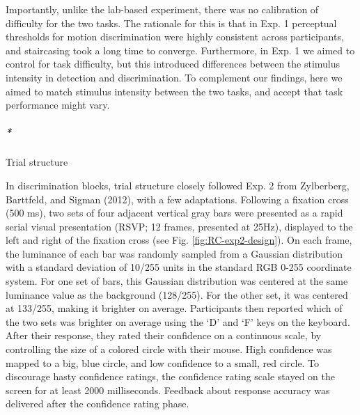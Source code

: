 \documentclass[
  english,
  man]{apa6}
\let\oldsubparagraph\subparagraph
\renewcommand{\subparagraph}[1]{\oldsubparagraph{#1}\mbox{}}
\begin{document}
Importantly, unlike the lab-based experiment, there was no calibration of difficulty for the two tasks. The rationale for this is that in Exp. 1 perceptual thresholds for motion discrimination were highly consistent across participants, and staircasing took a long time to converge. Furthermore, in Exp. 1 we aimed to control for task difficulty, but this introduced differences between the stimulus intensity in detection and discrimination. To complement our findings, here we aimed to match stimulus intensity between the two tasks, and accept that task performance might vary.

\hypertarget{trial-structure}{%
\subparagraph*{Trial structure}\label{trial-structure}}

In discrimination blocks, trial structure closely followed Exp. 2 from Zylberberg, Barttfeld, and Sigman (2012), with a few adaptations. Following a fixation cross (500 ms), two sets of four adjacent vertical gray bars were presented as a rapid serial visual presentation (RSVP; 12 frames, presented at 25Hz), displayed to the left and right of the fixation cross (see Fig. \ref{fig:RC-exp2-design}). On each frame, the luminance of each bar was randomly sampled from a Gaussian distribution with a standard deviation of 10/255 units in the standard RGB 0-255 coordinate system. For one set of bars, this Gaussian distribution was centered at the same luminance value as the background (128/255). For the other set, it was centered at 133/255, making it brighter on average. Participants then reported which of the two sets was brighter on average using the `D' and `F' keys on the keyboard. After their response, they rated their confidence on a continuous scale, by controlling the size of a colored circle with their mouse. High confidence was mapped to a big, blue circle, and low confidence to a small, red circle. To discourage hasty confidence ratings, the confidence rating scale stayed on the screen for at least 2000 milliseconds. Feedback about response accuracy was delivered after the confidence rating phase.
\end{document}
